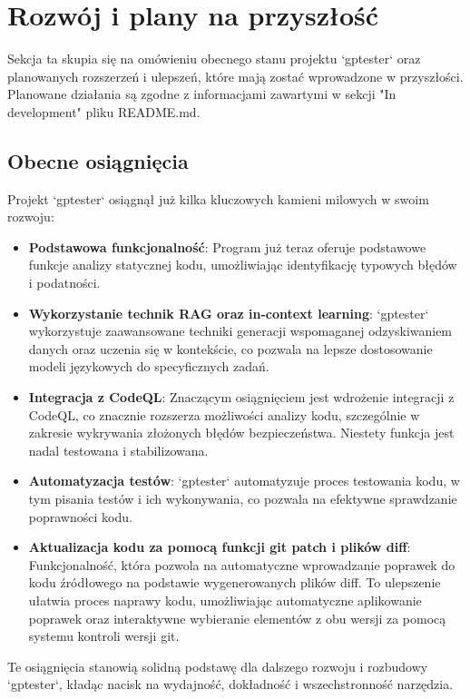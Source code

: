 \section{Rozwój i plany na przyszłość}
\label{sec:rozwoj_i_plany_na_przyszlosc}

Sekcja ta skupia się na omówieniu obecnego stanu projektu `gptester` oraz planowanych rozszerzeń i ulepszeń, które mają zostać wprowadzone w przyszłości. Planowane działania są zgodne z informacjami zawartymi w sekcji "In development" pliku README.md.

\subsection{Obecne osiągnięcia}
\label{subsec:obecne_osiagniecia}

Projekt `gptester` osiągnął już kilka kluczowych kamieni milowych w swoim rozwoju:

\begin{itemize}
    \item \textbf{Podstawowa funkcjonalność}: Program już teraz oferuje podstawowe funkcje analizy statycznej kodu, umożliwiając identyfikację typowych błędów i podatności.
    \item \textbf{Wykorzystanie technik RAG oraz in-context learning}: `gptester` wykorzystuje zaawansowane techniki generacji wspomaganej odzyskiwaniem danych oraz uczenia się w kontekście, co pozwala na lepsze dostosowanie modeli językowych do specyficznych zadań.
    \item \textbf{Integracja z CodeQL}: Znaczącym osiągnięciem jest wdrożenie integracji z CodeQL, co znacznie rozszerza możliwości analizy kodu, szczególnie w zakresie wykrywania złożonych błędów bezpieczeństwa. Niestety funkcja jest nadal testowana i stabilizowana.
    \item \textbf{Automatyzacja testów}: `gptester` automatyzuje proces testowania kodu, w tym pisania testów i ich wykonywania, co pozwala na efektywne sprawdzanie poprawności kodu.
    \item \textbf{Aktualizacja kodu za pomocą funkcji git patch i plików diff}: Funkcjonalność, która pozwola na automatyczne wprowadzanie poprawek do kodu źródłowego na podstawie wygenerowanych plików diff. To ulepszenie ułatwia proces naprawy kodu, umożliwiając automatyczne aplikowanie poprawek oraz interaktywne wybieranie elementów z obu wersji za pomocą systemu kontroli wersji git.
\end{itemize}

Te osiągnięcia stanowią solidną podstawę dla dalszego rozwoju i rozbudowy `gptester`, kładąc nacisk na wydajność, dokładność i wszechstronność narzędzia.

